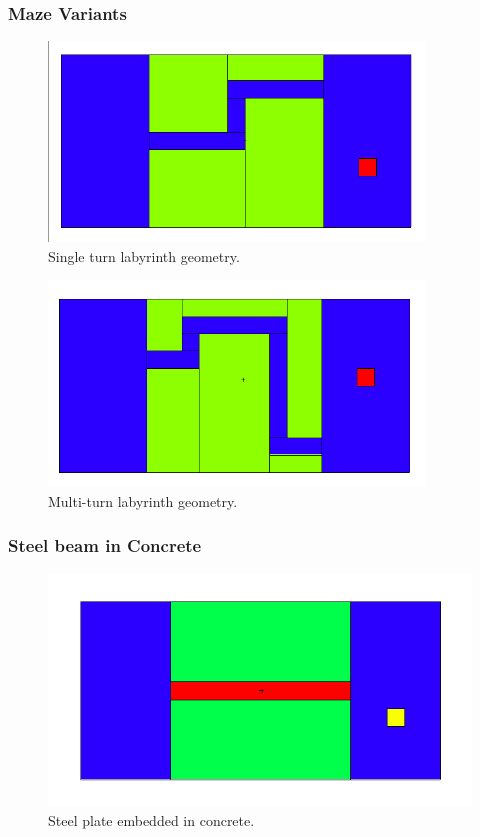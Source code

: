 \subsubsection*{Maze Variants}

\begin{figure}[h!]
  \centering
  \includegraphics[width=10cm]{./chapters/characterization_probs/figures/geometries/maze2.png}
  \caption[Single turn labyrinth geometry.]{Single turn labyrinth geometry.}
  \label{fig:maze2geom}
\end{figure}

\begin{figure}[h!]
  \centering
  \includegraphics[width=10cm]{./chapters/characterization_probs/figures/geometries/maze1.png}
  \caption[Multi-turn labyrinth geometry.]{Multi-turn labyrinth geometry.}
  \label{fig:maze1geom}
\end{figure}

\subsubsection*{Steel beam in Concrete}

\begin{figure}[h!]
  \centering
  \includegraphics[width=12cm]{./chapters/characterization_probs/figures/geometries/prob-1.png}
  \caption[Steel plate embedded in concrete.]{Steel plate embedded in concrete.}
  \label{fig:prob1geom}
\end{figure}

